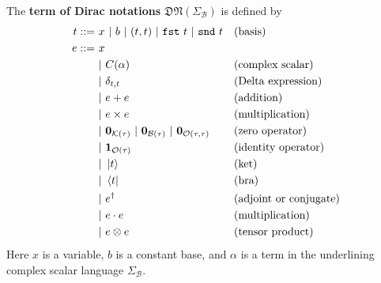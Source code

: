 \documentclass[manuscript, review, timestamp]{acmart}
\newcommand*{\fst}{\texttt{fst}}
\newcommand*{\snd}{\texttt{snd}}
\begin{document}
\begin{definition}
  The \textbf{term of Dirac notations} $\mathfrak{DN}(\Sigma_\mathcal{B})$ is defined by
  \begin{align*}
    t ::= \ & x\ |\ b\ |\ (t, t)\ |\ \fst\ t\ |\ \snd\ t  && \text{(basis)} \\
    e ::= \ 
      &    x                          \\
      & |\ C(\alpha)                     && \text{(complex scalar)}   \\
      & |\ \delta_{t, t}              && \text{(Delta expression)} \\
      & |\ e + e                      && \text{(addition)} \\
      & |\ e \times e                 && \text{(multiplication)} \\
      & |\ \mathbf{0}_{\mathcal{K}(\tau)}\ |\ \mathbf{0}_{\mathcal{B}(\tau)}\ |\ \mathbf{0}_{\mathcal{O}(\tau, \tau)}    && \text{(zero operator)}\\
      & |\ \mathbf{1}_{\mathcal{O}(\tau)} && \text{(identity operator)}\\
      & |\ \ket{t}                    && \text{(ket)} \\
      & |\ \bra{t}                    && \text{(bra)} \\
      & |\ e^\dagger                        && \text{(adjoint or conjugate)} \\
      & |\ e \cdot e                  && \text{(multiplication)} \\
      & |\ e \otimes e                && \text{(tensor product)}
  \end{align*}
  Here $x$ is a variable, $b$ is a constant base, and $\alpha$ is a term in the underlining complex scalar language $\Sigma_\mathcal{B}$.
\end{definition}
\end{document}

